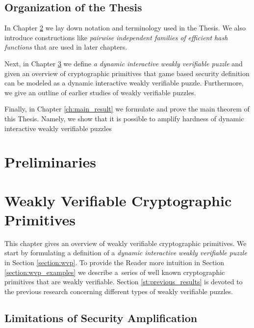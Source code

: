 \documentclass[11pt,a4paper,titlepage]{memoir}
\begin{document}
\section{Organization of the Thesis}
In Chapter \ref{ch:preliminaries} we lay down notation and terminology used in the Thesis.
We also introduce constructions like \textit{pairwise independent families of efficient hash functions} that are used in later chapters.

Next, in Chapter \ref{ch:intro_weakly} we define \textit{a dynamic interactive weakly verifiable puzzle} and
given an overview of cryptographic primitives that game based security definition can be modeled as
a dynamic interactive weakly verifiable puzzle. Furthermore, we give an outline of earlier studies
of weakly verifiable puzzles.

Finally, in Chapter \ref{ch:main_result} we formulate and prove the main theorem of this Thesis.
Namely, we show that it is possible to amplify hardness of dynamic interactive weakly verifiable puzzles
%
\chapter{Preliminaries}
\label{ch:preliminaries}


\chapter{Weakly Verifiable Cryptographic Primitives}
\label{ch:intro_weakly}
This chapter gives an overview of weakly verifiable cryptographic primitives.
We start by formulating a definition of a \textit{dynamic interactive weakly verifiable puzzle} in Section \ref{section:wvp}.
To provide the Reader more intuition in Section \ref{section:wvp_examples} we describe a~series of well known cryptographic primitives
that are weakly verifiable. Section \ref{st:previous_results} is devoted to the previous research concerning different types of weakly verifiable puzzles.
%



%
\section{Limitations of Security Amplification}
%
\end{document}
